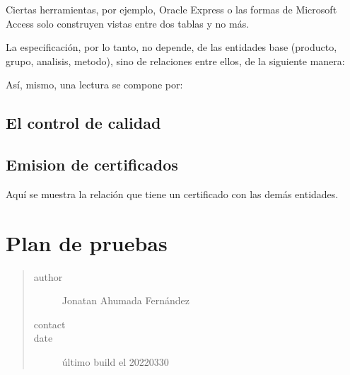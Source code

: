 \documentclass[letterpaper,10pt,spanish]{sphinxmanual}
\begin{document}
Ciertas herramientas, por ejemplo,
Oracle Express o las formas de Microsoft Access solo construyen vistas entre
dos tablas y no más.

La especificación, por lo tanto, no depende, de las entidades base (producto, grupo, analisis, metodo),
sino de relaciones entre ellos, de la siguiente manera:


Así, mismo, una lectura se compone por:



\section{El control de calidad}
\label{\detokenize{requerimientos/SDD:el-control-de-calidad}}


\section{Emision de certificados}
\label{\detokenize{requerimientos/SDD:emision-de-certificados}}
Aquí se muestra la relación que tiene un certificado con las demás entidades.



\chapter{Plan de pruebas}
\label{\detokenize{requerimientos/STPD:plan-de-pruebas}}\label{\detokenize{requerimientos/STPD::doc}}\begin{quote}\begin{description}
\item[{author}] \leavevmode
Jonatan Ahumada Fernández

\item[{contact}] \leavevmode
{}

\item[{date}] \leavevmode
último build el 2022\sphinxhyphen{}03\sphinxhyphen{}30

\end{description}\end{quote}
\end{document}
